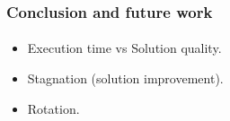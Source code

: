 \begin{frame}
    \frametitle{Conclusion and future work}
    \framesubtitle{}
    \begin{itemize}
        \item Execution time vs Solution quality.
        \item Stagnation (solution improvement).
        \item Rotation.
    \end{itemize}
\end{frame}

